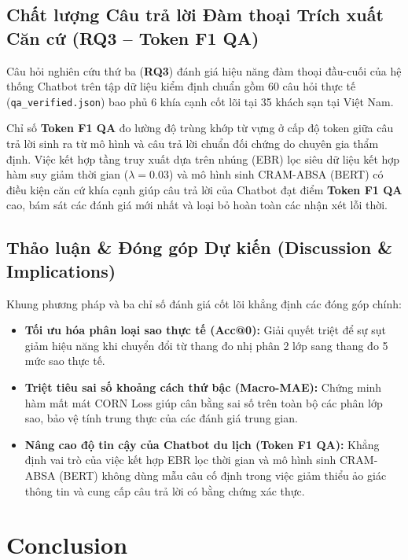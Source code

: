 \documentclass[pdflatex,sn-mathphys-num]{sn-jnl}
\theoremstyle{thmstyleone}
\theoremstyle{thmstyletwo}
\theoremstyle{thmstylethree}
\begin{document}
\subsection{Chất lượng Câu trả lời Đàm thoại Trích xuất Căn cứ (RQ3 -- Token F1 QA)}
\label{subsec:analysis_rq3}

Câu hỏi nghiên cứu thứ ba (\textbf{RQ3}) đánh giá hiệu năng đàm thoại đầu-cuối của hệ thống Chatbot trên tập dữ liệu kiểm định chuẩn gồm 60 câu hỏi thực tế (\texttt{qa\_verified.json}) bao phủ 6 khía cạnh cốt lõi tại 35 khách sạn tại Việt Nam.

Chỉ số \textbf{Token F1 QA} đo lường độ trùng khớp từ vựng ở cấp độ token giữa câu trả lời sinh ra từ mô hình và câu trả lời chuẩn đối chứng do chuyên gia thẩm định. Việc kết hợp tầng truy xuất dựa trên nhúng (EBR) lọc siêu dữ liệu kết hợp hàm suy giảm thời gian ($\lambda = 0.03$) và mô hình sinh CRAM-ABSA (BERT) có điều kiện căn cứ khía cạnh giúp câu trả lời của Chatbot đạt điểm \textbf{Token F1 QA} cao, bám sát các đánh giá mới nhất và loại bỏ hoàn toàn các nhận xét lỗi thời.

\subsection{Thảo luận \& Đóng góp Dự kiến (Discussion \& Implications)}
\label{subsec:discussion}

Khung phương pháp và ba chỉ số đánh giá cốt lõi khẳng định các đóng góp chính:
\begin{itemize}
    \item \textbf{Tối ưu hóa phân loại sao thực tế (Acc@0):} Giải quyết triệt để sự sụt giảm hiệu năng khi chuyển đổi từ thang đo nhị phân 2 lớp sang thang đo 5 mức sao thực tế.
    \item \textbf{Triệt tiêu sai số khoảng cách thứ bậc (Macro-MAE):} Chứng minh hàm mất mát CORN Loss giúp cân bằng sai số trên toàn bộ các phân lớp sao, bảo vệ tính trung thực của các đánh giá trung gian.
    \item \textbf{Nâng cao độ tin cậy của Chatbot du lịch (Token F1 QA):} Khẳng định vai trò của việc kết hợp EBR lọc thời gian và mô hình sinh CRAM-ABSA (BERT) không dùng mẫu câu cố định trong việc giảm thiểu ảo giác thông tin và cung cấp câu trả lời có bằng chứng xác thực.
\end{itemize}

\section{Conclusion}
\label{sec:conclusion}
\end{document}

